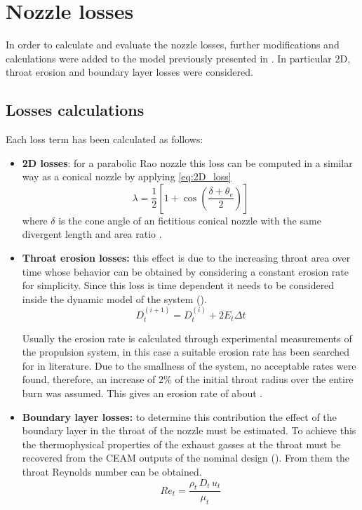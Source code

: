 \section{Nozzle losses}
\label{sec:nozzle_losses}

In order to calculate and evaluate the nozzle losses, further modifications and calculations were added to the model previously presented in \mref.
In particular 2D, throat erosion and boundary layer losses were considered.

\subsection{Losses calculations}  

Each loss term has been calculated as follows:
\begin{itemize}
    \item \textbf{2D losses}: for a parabolic Rao nozzle this loss can be computed in a similar way as a conical nozzle by applying \autoref{eq:2D_loss}
    \begin{equation}
        \lambda = \frac{1}{2} \left[ 1 + \cos \left( \frac{\delta + \theta_e}{2}\right)\right]
        \label{eq:2D_loss}
    \end{equation}
    where $\delta$ is the cone angle of an fictitious conical nozzle with the same divergent length and area ratio \cite{Sutton}.
    \item \textbf{Throat erosion losses:} this effect is due to the increasing throat area over time whose behavior can be obtained by considering a constant erosion rate for simplicity. Since this loss is time dependent it needs to be considered inside the dynamic model of the system (\mref).
    \begin{equation}
        D_t^{(i+1)} = D_t^{(i)} + 2 E_t \Delta t
    \end{equation}

    Usually the erosion rate is calculated through experimental measurements of the propulsion system, in this case a suitable erosion rate has been searched for in literature. Due to the smallness of the system, no acceptable rates were found, therefore, an increase of 2\% of the initial throat radius over the entire burn was assumed\cite{Sutton}\cite{tesi_malesia}. This gives an erosion rate of about \mref.
    \item \textbf{Boundary layer losses:} to determine this contribution the effect of the boundary layer in the throat of the nozzle must be estimated. To achieve this the thermophysical properties of the exhaust gasses at the throat must be recovered from the CEAM outputs of the nominal design (\mref). From them the throat Reynolds number can be obtained.
    \begin{equation}
        Re_t = \frac{\rho_t \, D_t \, u_t}{\mu_t}
    \end{equation}


\end{itemize}
